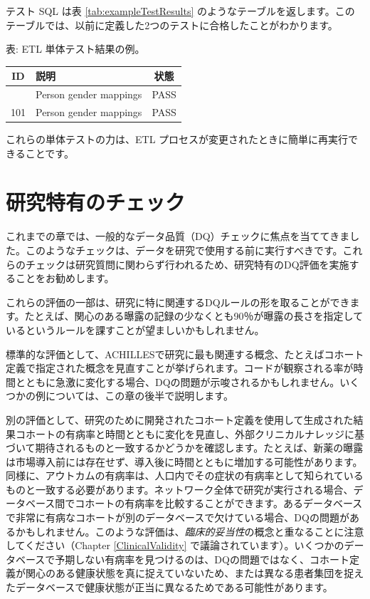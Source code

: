 \documentclass[
  11pt]{book}
\theoremstyle{definition}
\theoremstyle{definition}
\theoremstyle{definition}
\theoremstyle{definition}
\theoremstyle{remark}
\begin{document}
テスト SQL は表 \ref{tab:exampleTestResults} のようなテーブルを返します。このテーブルでは、以前に定義した2つのテストに合格したことがわかります。

表: \label{tab:exampleTestResults} ETL 単体テスト結果の例。

\begin{longtable}[]{@{}clc@{}}
\toprule\noalign{}
ID & 説明 & 状態 \\
\midrule\noalign{}
\endhead
\bottomrule\noalign{}
\endlastfoot
101 & Person gender mappings & PASS \\
101 & Person gender mappings & PASS \\
\end{longtable}

これらの単体テストの力は、ETL プロセスが変更されたときに簡単に再実行できることです。

\section{研究特有のチェック}\label{ux7814ux7a76ux7279ux6709ux306eux30c1ux30a7ux30c3ux30af}


これまでの章では、一般的なデータ品質（DQ）チェックに焦点を当ててきました。このようなチェックは、データを研究で使用する前に実行すべきです。これらのチェックは研究質問に関わらず行われるため、研究特有のDQ評価を実施することをお勧めします。

これらの評価の一部は、研究に特に関連するDQルールの形を取ることができます。たとえば、関心のある曝露の記録の少なくとも90％が曝露の長さを指定しているというルールを課すことが望ましいかもしれません。

標準的な評価として、ACHILLESで研究に最も関連する概念、たとえばコホート定義で指定された概念を見直すことが挙げられます。コードが観察される率が時間とともに急激に変化する場合、DQの問題が示唆されるかもしれません。いくつかの例については、この章の後半で説明します。

別の評価として、研究のために開発されたコホート定義を使用して生成された結果コホートの有病率と時間とともに変化を見直し、外部クリニカルナレッジに基づいて期待されるものと一致するかどうかを確認します。たとえば、新薬の曝露は市場導入前には存在せず、導入後に時間とともに増加する可能性があります。同様に、アウトカムの有病率は、人口内でその症状の有病率として知られているものと一致する必要があります。ネットワーク全体で研究が実行される場合、データベース間でコホートの有病率を比較することができます。あるデータベースで非常に有病なコホートが別のデータベースで欠けている場合、DQの問題があるかもしれません。このような評価は、\emph{臨床的妥当性}の概念と重なることに注意してください（Chapter \ref{ClinicalValidity} で議論されています）。いくつかのデータベースで予期しない有病率を見つけるのは、DQの問題ではなく、コホート定義が関心のある健康状態を真に捉えていないため、または異なる患者集団を捉えたデータベースで健康状態が正当に異なるためである可能性があります。
\end{document}
